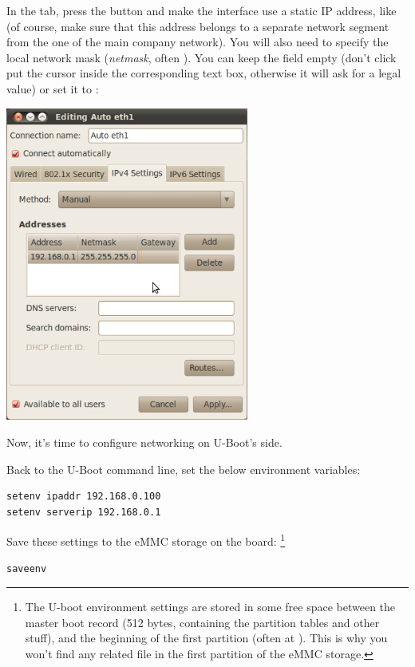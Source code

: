 In the  tab, press the  button and
make the interface use a static IP
address, like  (of course, make sure that this address
belongs to a separate network segment from the one of the main company
network). You will also need to specify the local network mask
(\emph{netmask}, often ). You can keep the
 field empty (don't click put the cursor inside the
corresponding text box, otherwise it will ask for a legal value)
or set it to :

\begin{center}
\includegraphics[width=8cm]{labs/kernel-board-setup/network-config-3.png}
\end{center}

Now, it's time to configure networking on U-Boot's side.

Back to the U-Boot command line, set the below environment variables:

\begin{verbatim}
setenv ipaddr 192.168.0.100
setenv serverip 192.168.0.1
\end{verbatim}

Save these settings to the eMMC storage on the board:
\footnote{The U-boot environment settings are stored in some free space
between the master boot record (512 bytes, containing the partition
tables and other stuff), and the beginning of the first partition (often
at ). This is why you won't find any related file in the
first partition of the eMMC storage.}

\begin{verbatim}
saveenv
\end{verbatim}

